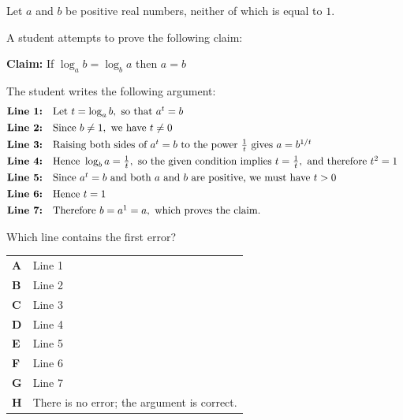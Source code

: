 \documentclass[11pt,a4paper]{article}
\begin{document}
\begin{enumerate}[label=\textbf{\arabic*.},leftmargin=*,itemsep=0pt,start=12]
Let $a$ and $b$ be positive real numbers, neither of which is equal to $1$. 

A student attempts to prove the following claim:
\begin{center} \begin{minipage}{0.82\linewidth} \centering \textbf{Claim:} If  $\log_a b=\log_b a$ then $a=b$ \end{minipage} \end{center}
The student writes the following argument: \[
\begin{array}{@{}ll}
\textbf{Line 1:} & \text{Let } t=\log_a b,\text{ so that }a^t=b \\[4pt]

\textbf{Line 2:} & \text{Since }b\neq1,\text{ we have }t\neq0 \\[4pt]

\textbf{Line 3:} &
\text{Raising both sides of }a^t=b\text{ to the power }\frac1t
\text{ gives }a=b^{1/t} \\[4pt]

\textbf{Line 4:} &
\text{Hence }\log_b a=\frac1t,\text{ so the given condition implies }
t=\frac1t,\text{ and therefore }t^2=1 \\[4pt]

\textbf{Line 5:} &
\text{Since }a^t=b\text{ and both }a\text{ and }b\text{ are positive, we must have }t>0 \\[4pt]

\textbf{Line 6:} & \text{Hence }t=1 \\[4pt]

\textbf{Line 7:} & \text{Therefore }b=a^1=a,\text{ which proves the claim.}
\end{array}
\]

Which line contains the first error?

\par\vspace*{12pt}
\begin{tabularx}{\linewidth}{@{}>{\bfseries}l Y@{}}
A &
Line 1
\\[0.8em]
B &
Line 2
\\[0.8em]
C &
Line 3
\\[0.8em]
D &
Line 4
\\[0.8em]
E &
Line 5
\\[0.8em]
F &
Line 6
\\[0.8em]
G &
Line 7
\\[0.8em]
H &
There is no error; the argument is correct.
\\
\end{tabularx}
\end{enumerate}
\end{document}
